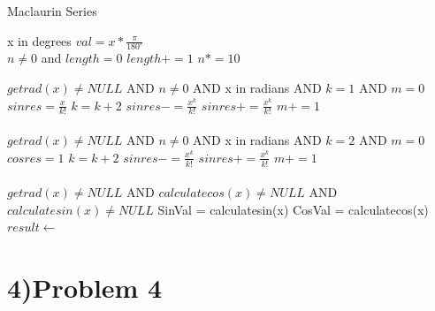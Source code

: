 \documentclass[letterpaper, 11pt]{report}
\begin{document}
\begin{algorithm}
\caption{Maclaurin Series} \label{alg:cap}
\begin{algorithmic}
\Require x in degrees
\State $val = x * \frac{\pi}{180^\circ}$\\
\EndFunction
\newline
\Require $n\neq 0$ and $length = 0$ 
\State $length += 1$
\State $n *= 10$
\EndWhile\\
\EndFunction
\end{algorithmic}
\end{algorithm}

\begin{algorithm}
\begin{algorithmic}
\Require $getrad(x)\neq NULL$ AND $n \neq 0$ AND x in radians AND $k = 1$ AND $m = 0$
\State $sinres = \frac{x}{k!}$
\State $k = k+2$
\State $sinres -= \frac{x^k}{k!}$ 
\Else
\State $sinres += \frac{x^k}{k!}$ 
\EndIf
\State $m+=1$
\EndWhile\\
\EndFunction\\
\newline
\Require $getrad(x)\neq NULL$ AND $n \neq 0$ AND x in radians AND $k = 2$ AND $m = 0$
\State $cosres = 1$
\State $k = k+2$
\State $sinres -= \frac{x^k}{k!}$ 
\Else
\State $sinres += \frac{x^k}{k!}$ 
\EndIf
\State $m+=1$
\EndWhile\\
\EndFunction\\

\Require $getrad(x)\neq NULL$ AND $ calculatecos(x)\neq NULL$ AND $calculatesin(x)\neq NULL$
\State SinVal = calculatesin(x)
\State CosVal = calculatecos(x)\\
\EndFunction
\State $result \gets $
\end{algorithmic}
\end{algorithm}
\pagebreak
\newpage
{}
\section*{4)Problem 4}
\end{document}

